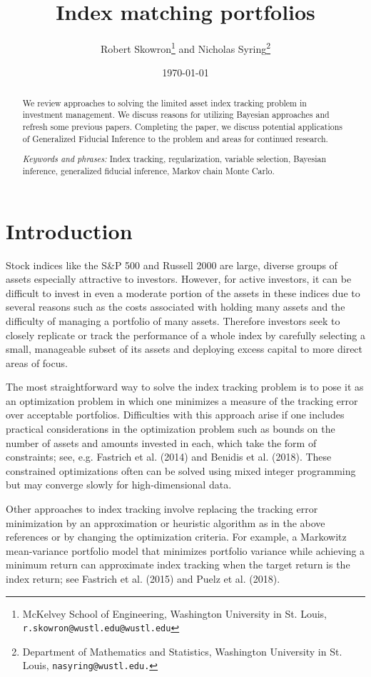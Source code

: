 \documentclass[a4paper, 12pt]{article}
\title{Index matching portfolios}
\author{Robert Skowron\footnote{McKelvey School of Engineering, Washington University in St. Louis, {\tt r.skowron@wustl.edu@wustl.edu}} \quad and \quad Nicholas Syring\footnote{Department of Mathematics and Statistics, Washington University in St. Louis,  {\tt nasyring@wustl.edu.}}}
\date{\today}
\theoremstyle{plain}
\theoremstyle{definition}
\theoremstyle{remark}
\begin{document}
\maketitle



\begin{abstract}
	We review approaches to solving the limited asset index tracking problem in investment management. We discuss reasons for utilizing Bayesian approaches and refresh some previous papers. Completing the paper, we discuss potential applications of Generalized Fiducial Inference to the problem and areas for continued research.


\smallskip

\emph{Keywords and phrases:} Index tracking, regularization, variable selection, Bayesian inference, generalized fiducial inference, Markov chain Monte Carlo.

\end{abstract}


\section{Introduction}
\label{S:intro}

Stock indices like the S\&P 500 and Russell 2000 are large, diverse groups of assets especially attractive to investors.  However, for active investors, it can be difficult to invest in even a moderate portion of the assets in these indices due to several reasons such as the costs associated with holding many assets and the difficulty of managing a portfolio of many assets.  Therefore investors seek to closely replicate or track the performance of a whole index by carefully selecting a small, manageable subset of its assets and deploying excess capital to more direct areas of focus.

The most straightforward way to solve the index tracking problem is to pose it as an optimization problem in which one minimizes a measure of the tracking error over acceptable portfolios.  Difficulties with this approach arise if one includes practical considerations in the optimization problem such as bounds on the number of assets and amounts invested in each, which take the form of constraints; see, e.g. Fastrich et al. (2014) and Benidis et al. (2018).  These constrained optimizations often can be solved using mixed integer programming but may converge slowly for high-dimensional data.  

Other approaches to index tracking involve replacing the tracking error minimization by an approximation or heuristic algorithm as in the above references or by changing the optimization criteria.  For example, a Markowitz mean-variance portfolio model that minimizes portfolio variance while achieving a minimum return can approximate index tracking when the target return is the index return; see Fastrich et al. (2015) and Puelz et al. (2018).   
\end{document}
